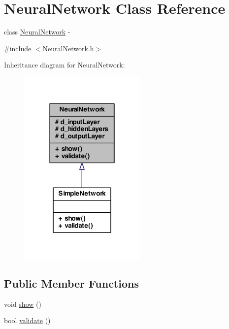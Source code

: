 \hypertarget{class_neural_network}{
\section{NeuralNetwork Class Reference}
\label{class_neural_network}
}


class \hyperlink{class_neural_network}{NeuralNetwork} -\/  




{\ttfamily \#include $<$NeuralNetwork.h$>$}



Inheritance diagram for NeuralNetwork:
\nopagebreak
\begin{figure}[H]
\begin{center}
\leavevmode
\includegraphics[width=178pt]{class_neural_network__inherit__graph}
\end{center}
\end{figure}
\subsection*{Public Member Functions}
\begin{DoxyCompactItemize}
\item 
void \hyperlink{class_neural_network_abaaf6b63ffe8a48d6efe55d702da5d1a}{show} ()
\item 
bool \hyperlink{class_neural_network_ae0a46bc39bde3b67a19f11e51a2a5191}{validate} ()
\end{DoxyCompactItemize}
